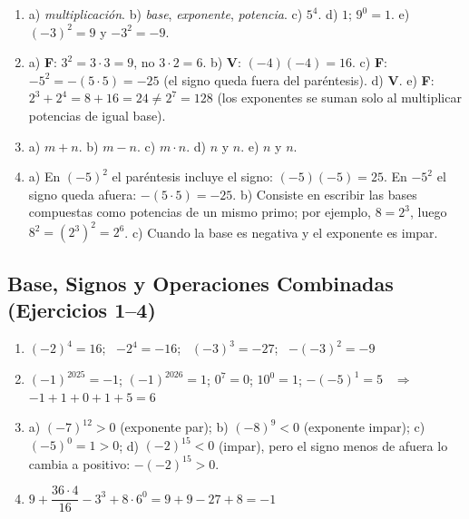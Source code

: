 \documentclass[12pt, letterpaper]{article}
\begin{document}
  \begin{enumerate}[leftmargin=*, label=\textbf{\arabic*.}]
    \item a) \emph{multiplicación}. \quad b) \emph{base}, \emph{exponente}, \emph{potencia}. \quad c) $5^{4}$. \quad d) $1$; $9^{0} = 1$. \quad e) $(-3)^{2} = 9$ y $-3^{2} = -9$.

    \item a) \textbf{F}: $3^{2} = 3 \cdot 3 = 9$, no $3 \cdot 2 = 6$. \quad b) \textbf{V}: $(-4)(-4) = 16$. \quad c) \textbf{F}: $-5^{2} = -(5 \cdot 5) = -25$ (el signo queda fuera del paréntesis). \quad d) \textbf{V}. \quad e) \textbf{F}: $2^{3} + 2^{4} = 8 + 16 = 24 \neq 2^{7} = 128$ (los exponentes se suman solo al multiplicar potencias de igual base).

    \item a) $m + n$. \quad b) $m - n$. \quad c) $m \cdot n$. \quad d) $n$ y $n$. \quad e) $n$ y $n$.

    \item a) En $(-5)^{2}$ el paréntesis incluye el signo: $(-5)(-5) = 25$. En $-5^{2}$ el signo queda afuera: $-(5 \cdot 5) = -25$.
          \quad b) Consiste en escribir las bases compuestas como potencias de un mismo primo; por ejemplo, $8 = 2^{3}$, luego $8^{2} = (2^{3})^{2} = 2^{6}$.
          \quad c) Cuando la base es negativa y el exponente es impar.
  \end{enumerate}

  \subsection*{Base, Signos y Operaciones Combinadas (Ejercicios 1--4)}

  \begin{enumerate}[leftmargin=*, label=\textbf{\arabic*.}]
    \item $(-2)^{4} = 16$; \ $-2^{4} = -16$; \ $(-3)^{3} = -27$; \ $-(-3)^{2} = -9$
    \item $(-1)^{2025} = -1$; $(-1)^{2026} = 1$; $0^{7} = 0$; $10^{0} = 1$; $-(-5)^{1} = 5$ \ $\Rightarrow$ $-1 + 1 + 0 + 1 + 5 = 6$
    \item a) $(-7)^{12} > 0$ (exponente par); \quad b) $(-8)^{9} < 0$ (exponente impar); \quad c) $(-5)^{0} = 1 > 0$; \quad d) $(-2)^{15} < 0$ (impar), pero el signo menos de afuera lo cambia a positivo: $-(-2)^{15} > 0$.
    \item $9 + \dfrac{36 \cdot 4}{16} - 3^{3} + 8 \cdot 6^{0} = 9 + 9 - 27 + 8 = -1$
  \end{enumerate}
\end{document}
